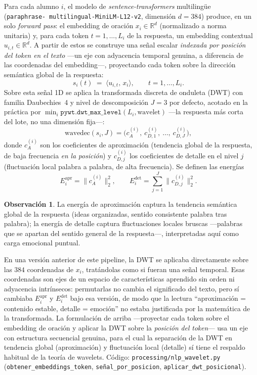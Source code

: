 \documentclass[11pt,a4paper,oneside]{article}
\theoremstyle{definition}
\newtheorem{remark}[definition]{Observación}
\begin{document}
Para cada alumno $i$, el modelo de \emph{sentence-transformers} multilingüe (\texttt{paraphrase-
multilingual-MiniLM-L12-v2}, dimensión $d=384$) produce, en un solo \emph{forward pass}: el
embedding de oración $x_i\in\mathbb{R}^d$ (normalizado a norma unitaria) y, para cada token
$t=1,\ldots,L_i$ de la respuesta, un embedding contextual $u_{i,t}\in\mathbb{R}^d$. A partir de
estos se construye una señal escalar \emph{indexada por posición del token en el texto}
—un eje con adyacencia temporal genuina, a diferencia de las coordenadas del embedding—,
proyectando cada token sobre la dirección semántica global de la respuesta:
\[
s_i(t) \;=\; \langle u_{i,t},\, x_i\rangle, \qquad t=1,\ldots,L_i.
\]
Sobre esta señal 1D se aplica la transformada discreta de onduleta (DWT) con familia
Daubechies~4 y nivel de descomposición $J=3$ por defecto, acotado en la práctica por
$\min_i \texttt{pywt.dwt\_max\_level}(L_i,\text{wavelet})$ —la respuesta más corta del lote,
no una dimensión fija—:
\[
\mathrm{wavedec}(s_i, J) = \big(c^{(i)}_A,\ c^{(i)}_{D,1},\ \ldots,\ c^{(i)}_{D,J}\big),
\]
donde $c^{(i)}_A$ son los coeficientes de aproximación (tendencia global de la respuesta, de
baja frecuencia \emph{en la posición}) y $c^{(i)}_{D,j}$ los coeficientes de detalle en el nivel
$j$ (fluctuación local palabra a palabra, de alta frecuencia). Se definen las energías
\[
E^{\mathrm{apr}}_i = \big\lVert c^{(i)}_A \big\rVert_2^2,
\qquad
E^{\mathrm{det}}_i = \sum_{j=1}^{J} \big\lVert c^{(i)}_{D,j} \big\rVert_2^2 .
\]

\begin{remark}
La energía de aproximación captura la tendencia semántica global de la respuesta (ideas
organizadas, sentido consistente palabra tras palabra); la energía de detalle captura
fluctuaciones locales bruscas —palabras que se apartan del sentido general de la respuesta—,
interpretadas aquí como carga emocional puntual.
\end{remark}

\begin{implBox}[title=Corrección de diseño]
En una versión anterior de este pipeline, la DWT se aplicaba directamente sobre las $384$
coordenadas de $x_i$, tratándolas como si fueran una señal temporal. Esas coordenadas son ejes
de un espacio de características aprendido sin orden ni adyacencia intrínsecos: permutarlas no
cambia el significado del texto, pero sí cambiaba $E^{\mathrm{apr}}_i$ y $E^{\mathrm{det}}_i$
bajo esa versión, de modo que la lectura ``aproximación = contenido estable, detalle = emoción''
no estaba justificada por la matemática de la transformada. La formulación de arriba —proyectar
cada token sobre el embedding de oración y aplicar la DWT sobre la \emph{posición del token}—
usa un eje con estructura secuencial genuina, para el cual la separación de la DWT en
tendencia global (aproximación) y fluctuación local (detalle) sí tiene el respaldo habitual de
la teoría de wavelets. Código: \texttt{processing/nlp\_wavelet.py}
(\texttt{obtener\_embeddings\_token}, \texttt{señal\_por\_posicion},
\texttt{aplicar\_dwt\_posicional}).
\end{implBox}
\end{document}
